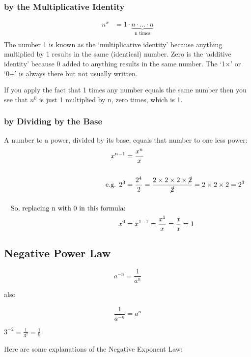 \documentclass{article}
\begin{document}
\subsubsection{by the Multiplicative Identity}
\begin{align*}
n^x&=1 \cdot \underbrace{n \cdot \ldots \cdot n}_{\text{n times}}\\
\end{align*}
The number 1 is known as the ‘multiplicative identity’ because anything multiplied by 1 results in the same (identical) number. Zero is the ‘additive identity’ because 0 added to anything results in the same number. The ‘1×’ or ‘0+’ is always there but not usually written.

If you apply the fact that 1 times any number equals the same number then you see that $n^0$ is just 1 multiplied by n, zero times, which is 1.

\subsubsection{by Dividing by the Base}
A number to a power, divided by its base, equals that number
	to one less power:
\begin{align*}
x^{n-1}&=\frac{x^n}{x}\\
\\
\text{e.g. }2^3&=\frac{2^4}{2}=\frac{2 \times 2 \times 2 \times \cancel{2}}{\cancel{2}}=2 \times 2 \times 2=2^3\\
\\
\text{So, replacing n with 0 in this formula:}\\
x^0&=x^{1-1}=\frac{x^1}{x}=\frac{x}{x}=1
\end{align*}

\newpage

\subsection{Negative Power Law}
\begin{Large}
$$a^{-n}=\frac{1}{a^n}$$
\begin{center}
also
\end{center}
$$\frac{1}{a^{-n}}=a^n$$
\end{Large}
\begin{center}
$3^{-2}=\frac{1}{3^2}=\frac{1}{9}$\\
\end{center}

\noindent
Here are some explanations of the Negative Exponent Law:
\end{document}
